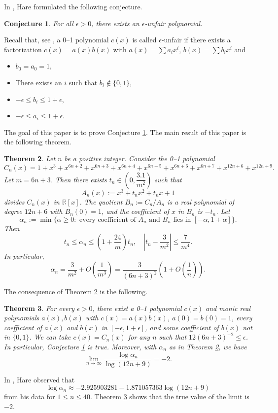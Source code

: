 \documentclass[a4paper,12pt,english,reqno]{amsart}
\newtheorem{thm}{Theorem}
\newtheorem{conj}[thm]{Conjecture}
\theoremstyle{definition}
\theoremstyle{remark}
\newcommand{\R}{{\mathbb R}}
\begin{document}
In \cite{Hare}, Hare formulated the following conjecture.
\begin{conj}\cite[Conjecture~6.4]{Hare}\label{C3} For all $\epsilon>0$, there exists an $\epsilon$-unfair polynomial.
   \end{conj}
   Recall that, see \cite[Definition~5.1]{Hare}, a 0--1 polynomial $c(x)$ is called $\epsilon$-unfair if there exists a factorization $c(x) = a(x) b(x)$ with $a(x) = \sum a_i x^i$, $b(x) = \sum b_i x^i$ and 
    \begin{itemize}
        \item $b_0 = a_0 = 1$,
        \item There exists an $i$ such that $b_i \not\in \{0,1\}$,
        \item $-\epsilon \leq b_i \leq 1+\epsilon$,
        \item $-\epsilon \leq a_i \leq 1+\epsilon$.
    \end{itemize}
The goal of this paper is to prove Conjecture \ref{C3}. The main result of this paper is the following theorem.
\begin{thm}\label{T1}
Let $n$ be a positive integer. Consider the 0--1 polynomial 
\[C_n(x)=1+x^3+x^{6n+2}+x^{6n+3}+x^{6n+4}+x^{6n+5}+x^{6n+6}+x^{6n+7}+x^{12n+6}+x^{12n+9}.\]
Let $m=6n+3$. Then there exists $t_n\in (0,\dfrac{3.1}{m^2})$ such that \[A_n(x):=x^3+t_nx^2+t_nx+1\]
divides $C_n(x)$ in $\R[x]$. The quotient $B_n:=C_n/A_n$ is a real polynomial of degree $12n+6$ with $B_n(0)=1$, and the coefficient of $x$ in $B_n$ is $-t_n$. Let \[\alpha_n:=\min\{\alpha\geq 0\colon \text{ every coefficient of $A_n$ and $B_n$ lies in $[-\alpha,1+\alpha]$}\}.\]
Then \begin{equation}\label{E1}t_n\leq \alpha_n\leq \left(1+\dfrac{24}{m}\right)t_n,\quad |t_n-\dfrac{3}{m^2}|\leq \dfrac{7}{m^4}.\end{equation}
In particular, \begin{equation}\label{alpha_n}\alpha_n=\dfrac{3}{m^2}+O\left(\dfrac{1}{m^3}\right)=\dfrac{3}{(6n+3)^2}\left(1+O\left(\dfrac{1}{n}\right)\right).\end{equation}
\end{thm}
The consequence of Theorem \ref{T1} is the following. 
\begin{thm}\label{T2} For every $\epsilon>0$, there exist a 0--1 polynomial $c(x)$ and monic real polynomials $a(x),b(x)$ with $c(x)=a(x)b(x)$, $a(0)=b(0)=1$, every coefficient of $a(x)$ and $b(x)$ in $[-\epsilon,1+\epsilon]$, and some coefficient of $b(x)$ not in $\{0,1\}$. We can take $c(x)=C_n(x)$ for any $n$ such that $12(6n+3)^{-2}\leq \epsilon$.  In particular, Conjecture \ref{C3} is true.  Moreover, with $\alpha_n$ as in Theorem \ref{T1}, we have
\begin{equation}\label{E2}\lim\limits_{n\rightarrow \infty}\dfrac{\log \alpha_n}{\log(12n+9)}=-2.\end{equation}
\end{thm}
In \cite{Hare}, Hare observed that \[\log \alpha_n\approx -2.925903281-1.871057363 \log(12n + 9)\] from his data for $1\leq n\leq 40$. Theorem \ref{T2} shows that the true value of the limit is $-2$. 
\end{document}
